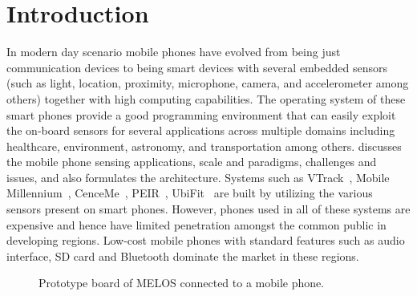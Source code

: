 \documentclass[10pt]{sigplan-proc-varsize}
\newcommand{\melos}{MELOS }
\begin{document}
\section{Introduction}
  \label{sec:intro}
%

In modern day scenario mobile phones have evolved from being just communication devices to being smart devices with several embedded sensors (such as light, location, proximity, microphone, camera, and accelerometer among others) together with high computing capabilities. The operating system of these smart phones provide a good programming environment that can easily exploit the on-board sensors for several applications across multiple domains including healthcare, environment, astronomy, and transportation among others. \cite{mobilesurvey} discusses the mobile phone sensing applications, scale and paradigms, challenges and issues, and also formulates the architecture. Systems such as VTrack~\cite{vtrack}, Mobile Millennium~\cite{mobilemillennium}, CenceMe~\cite{CenceMe}, PEIR~\cite{peir}, UbiFit~\cite{UbiFit} are built by utilizing the various sensors present on smart phones. However, phones used in all of these systems are expensive and hence have limited penetration amongst the common public in developing regions. Low-cost mobile phones with standard features such as audio interface, SD card and Bluetooth dominate the market in these regions. 

\begin{figure}
\centering
{}
\caption{Prototype board of \melos connected to a mobile phone.}
\label{fig:melosboard}
\end{figure}
\end{document}
